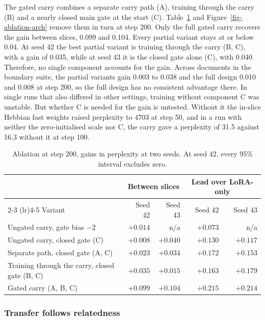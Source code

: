 \documentclass[10pt]{article} %
\begin{document}
The gated carry combines a separate carry path (A), training through the carry (B) and a nearly closed main gate at the start (C). Table~\ref{tab-ablation} and Figure~\ref{fig-ablation-arch} remove them in turn at step 200. Only the full gated carry recovers the gain between slices, 0.099 and 0.104. Every partial variant stays at or below 0.04. At seed 42 the best partial variant is training through the carry (B, C), with a gain of 0.035, while at seed 43 it is the closed gate alone (C), with 0.040. Therefore, no single component accounts for the gain. Across documents in the boundary suite, the partial variants gain 0.003 to 0.038 and the full design 0.010 and 0.008 at step 200, so the full design has no consistent advantage there. In single runs that also differed in other settings, training without component C was unstable. But whether C is needed for the gain is untested. Without it the in-slice Hebbian fast weights raised perplexity to 4703 at step 50, and in a run with neither the zero-initialised scale nor C, the carry gave a perplexity of 31.5 against 16.3 without it at step 100.
\begin{table}[tbp]
  \centering
  \small
  \begin{tabular}{lrrrr}
    \toprule
    & \multicolumn{2}{c}{Between slices} & \multicolumn{2}{c}{Lead over LoRA-only} \\
    \cmidrule(lr){2-3} \cmidrule(lr){4-5}
    Variant & Seed 42 & Seed 43 & Seed 42 & Seed 43 \\
    \midrule
    Ungated carry, gate bias $-2$ & $+0.014$ & n/a & $+0.073$ & n/a \\
    Ungated carry, closed gate (C) & $+0.008$ & $+0.040$ & $+0.130$ & $+0.117$ \\
    Separate path, closed gate (A, C) & $+0.023$ & $+0.034$ & $+0.172$ & $+0.153$ \\
    Training through the carry, closed gate (B, C) & $+0.035$ & $+0.015$ & $+0.163$ & $+0.179$ \\
    Gated carry (A, B, C) & $+0.099$ & $+0.104$ & $+0.215$ & $+0.214$ \\
    \bottomrule
  \end{tabular}
    \caption{Ablation at step 200, gains in perplexity at two seeds. At seed 42, every 95\% interval excludes zero.}
  \label{tab-ablation}
\end{table}

\subsubsection{Transfer follows relatedness}
\label{sec-transfer}
\end{document}
